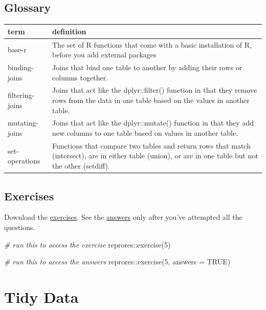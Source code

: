 \documentclass[
  oneside]{book}
\newenvironment{Shaded}{\begin{snugshade}}{\end{snugshade}}
\newcommand{\AttributeTok}[1]{\textcolor[rgb]{0.77,0.63,0.00}{#1}}
\newcommand{\CommentTok}[1]{\textcolor[rgb]{0.56,0.35,0.01}{\textit{#1}}}
\newcommand{\ConstantTok}[1]{\textcolor[rgb]{0.00,0.00,0.00}{#1}}
\newcommand{\DecValTok}[1]{\textcolor[rgb]{0.00,0.00,0.81}{#1}}
\newcommand{\FunctionTok}[1]{\textcolor[rgb]{0.00,0.00,0.00}{#1}}
\newcommand{\NormalTok}[1]{#1}
\newcommand{\SpecialCharTok}[1]{\textcolor[rgb]{0.00,0.00,0.00}{#1}}
\begin{document}
\hypertarget{glossary-joins}{%
\section{Glossary}\label{glossary-joins}}

\begin{tabular}{l|l}
\hline
term & definition\\
\hline
base-r & The set of R functions that come with a basic installation of R, before you add external packages\\
\hline
binding-joins & Joins that bind one table to another by adding their rows or columns together.\\
\hline
filtering-joins & Joins that act like the dplyr::filter() function in that they remove rows from the data in one table based on the values in another table.\\
\hline
mutating-joins & Joins that act like the dplyr::mutate() function in that they add new columns to one table based on values in another table.\\
\hline
set-operations & Functions that compare two tables and return rows that match (intersect), are in either table (union), or are in one table but not the other (setdiff).\\
\hline
\end{tabular}

\hypertarget{exercises-joins}{%
\section{Exercises}\label{exercises-joins}}

Download the \href{exercises/05_joins_exercise.Rmd}{exercises}. See the \href{exercises/05_joins_answers.Rmd}{answers} only after you've attempted all the questions.

\begin{Shaded}
\begin{Highlighting}[]
\CommentTok{\# run this to access the exercise}
\NormalTok{reprores}\SpecialCharTok{::}\FunctionTok{exercise}\NormalTok{(}\DecValTok{5}\NormalTok{)}

\CommentTok{\# run this to access the answers}
\NormalTok{reprores}\SpecialCharTok{::}\FunctionTok{exercise}\NormalTok{(}\DecValTok{5}\NormalTok{, }\AttributeTok{answers =} \ConstantTok{TRUE}\NormalTok{)}
\end{Highlighting}
\end{Shaded}

\hypertarget{tidyr}{%
\chapter{Tidy Data}\label{tidyr}}
\end{document}
